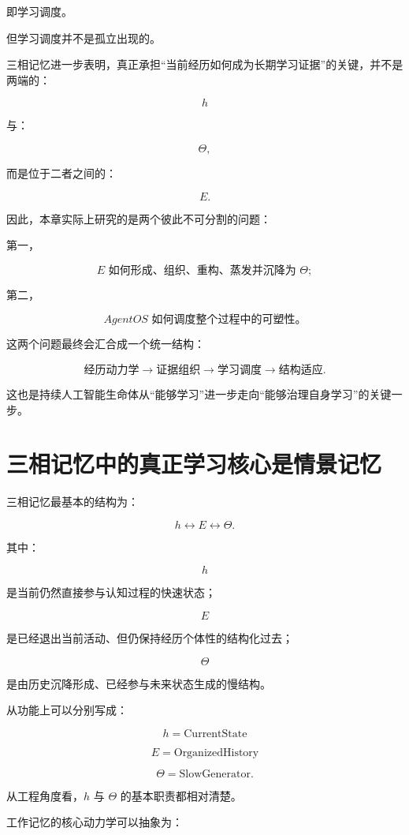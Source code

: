 即学习调度。

但学习调度并不是孤立出现的。

三相记忆进一步表明，真正承担“当前经历如何成为长期学习证据”的关键，并不是两端的：

\[
h
\]

与：

\[
\Theta,
\]

而是位于二者之间的：

\[
\boxed{
E.
}
\]

因此，本章实际上研究的是两个彼此不可分割的问题：

第一，

\[
\boxed{
E\text{ 如何形成、组织、重构、蒸发并沉降为 }\Theta;
}
\]

第二，

\[
\boxed{
AgentOS\text{ 如何调度整个过程中的可塑性。}
}
\]

这两个问题最终会汇合成一个统一结构：

\[
\boxed{
\text{经历动力学}
\rightarrow
\text{证据组织}
\rightarrow
\text{学习调度}
\rightarrow
\text{结构适应}.
}
\]

这也是持续人工智能生命体从“能够学习”进一步走向“能够治理自身学习”的关键一步。


\section{三相记忆中的真正学习核心是情景记忆}

三相记忆最基本的结构为：

\[
h
\leftrightarrow
E
\leftrightarrow
\Theta.
\]

其中：

\[
h
\]

是当前仍然直接参与认知过程的快速状态；

\[
E
\]

是已经退出当前活动、但仍保持经历个体性的结构化过去；

\[
\Theta
\]

是由历史沉降形成、已经参与未来状态生成的慢结构。

从功能上可以分别写成：

\[
\boxed{
h=\text{CurrentState}
}
\]

\[
\boxed{
E=\text{OrganizedHistory}
}
\]

\[
\boxed{
\Theta=\text{SlowGenerator}.
}
\]

从工程角度看，\(h\) 与 \(\Theta\) 的基本职责都相对清楚。

工作记忆的核心动力学可以抽象为：

